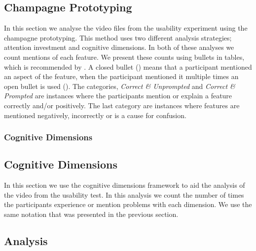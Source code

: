 \subsection{Champagne Prototyping}
In this section we analyse the video files from the usability experiment using the champagne prototyping. This method uses two different analysis strategies; attention investment and cognitive dimensions. In both of these analyses we count mentions of each feature. We present these counts using bullets in tables, which is recommended by \cite{blackwell2004champagne}. A closed bullet (\mn) means that a participant mentioned an aspect of the feature, when the participant mentioned it multiple times an open bullet is used (\mns). The categories, \textit{Correct \& Unprompted} and \textit{Correct \& Prompted} are instances where the participants mention or explain a feature correctly and/or positively. The last category are instances where features are mentioned negatively, incorrectly or is a cause for confusion.



\subsubsection{Cognitive Dimensions}
\subsection{Cognitive Dimensions}
In this section we use the cognitive dimensions framework to aid the analysis of the video from the usability test. In this analysis we count the number of times the participants experience or mention problems with each dimension. We use the same notation that was presented in the previous section.

\begin{table}[H]
	\caption{Cognitive Dimensions Findings}
	\label{tab:cog-dim-findings}
\end{table}

\subsection{Analysis}
\metasheep




